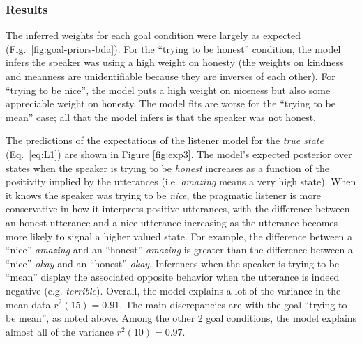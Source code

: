 \documentclass[10pt,letterpaper]{article}
\newcommand{\ndg}[1]{\textcolor{Green}{[ndg: #1]}}
\newcommand{\mht}[1]{\textcolor{DarkOrange}{[mht: #1]}}
\begin{document}
%


\subsubsection{Results}


The inferred weights for each goal condition were largely as expected (Fig.~\ref{fig:goal-priors-bda}).
For the ``trying to be honest'' condition, the model infers the speaker was using a high weight on honesty (the weights on kindness and meanness are unidentifiable because they are inverses of each other).
For ``trying to be nice'', the model puts a high weight on niceness but also some appreciable weight on honesty.
The model fits are worse for the ``trying to be mean'' case; all that the model infers is that the speaker was not honest.

The predictions of the expectations of the listener model for the \emph{true state} (Eq.~\ref{eq:L1}) are shown in Figure \ref{fig:exp3}.
The model's expected posterior over states when the speaker is trying to be \emph{honest} increases as a function of the positivity implied by the utterances (i.e. \emph{amazing} means a very high state).
When it knows the speaker was trying to be \emph{nice}, the pragmatic listener is more conservative in how it interprets positive utterances, with the difference between an honest utterance and a nice utterance increasing as the utterance becomes more likely to signal a higher valued state.
For example, the difference between a ``nice'' \emph{amazing} and an ``honest'' \emph{amazing} is greater than the difference between a ``nice'' \emph{okay} and an ``honest'' \emph{okay}.
Inferences when the speaker is trying to be ``mean'' display the associated opposite behavior when the utterance is indeed negative (e.g. \emph{terrible}).
Overall, the model explains a lot of the variance in the mean data $r^2(15) = 0.91$.
The main discrepancies are with the goal ``trying to be mean'', as noted above.
Among the other 2 goal conditions, the model explains almost all of the variance $r^2(10) = 0.97$.
\end{document}
